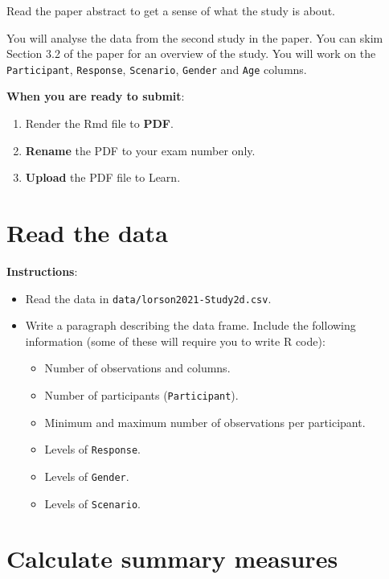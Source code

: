 \documentclass[
]{article}
\providecommand{\tightlist}{%
  \setlength{\itemsep}{0pt}\setlength{\parskip}{0pt}}
\begin{document}
Read the paper abstract to get a sense of what the study is about.

You will analyse the data from the second study in the paper. You can
skim Section 3.2 of the paper for an overview of the study. You will
work on the \texttt{Participant}, \texttt{Response}, \texttt{Scenario},
\texttt{Gender} and \texttt{Age} columns.

\textbf{When you are ready to submit}:

\begin{enumerate}
\def\labelenumi{\arabic{enumi}.}
\tightlist
\item
  Render the Rmd file to \textbf{PDF}.
\item
  \textbf{Rename} the PDF to your exam number only.
\item
  \textbf{Upload} the PDF file to Learn.
\end{enumerate}

\section{Read the data}\label{read-the-data}

\textbf{Instructions}:

\begin{itemize}
\tightlist
\item
  Read the data in \texttt{data/lorson2021-Study2d.csv}.
\item
  Write a paragraph describing the data frame. Include the following
  information (some of these will require you to write R code):

  \begin{itemize}
  \tightlist
  \item
    Number of observations and columns.
  \item
    Number of participants (\texttt{Participant}).
  \item
    Minimum and maximum number of observations per participant.
  \item
    Levels of \texttt{Response}.
  \item
    Levels of \texttt{Gender}.
  \item
    Levels of \texttt{Scenario}.
  \end{itemize}
\end{itemize}

\section{Calculate summary measures}\label{calculate-summary-measures}
\end{document}
